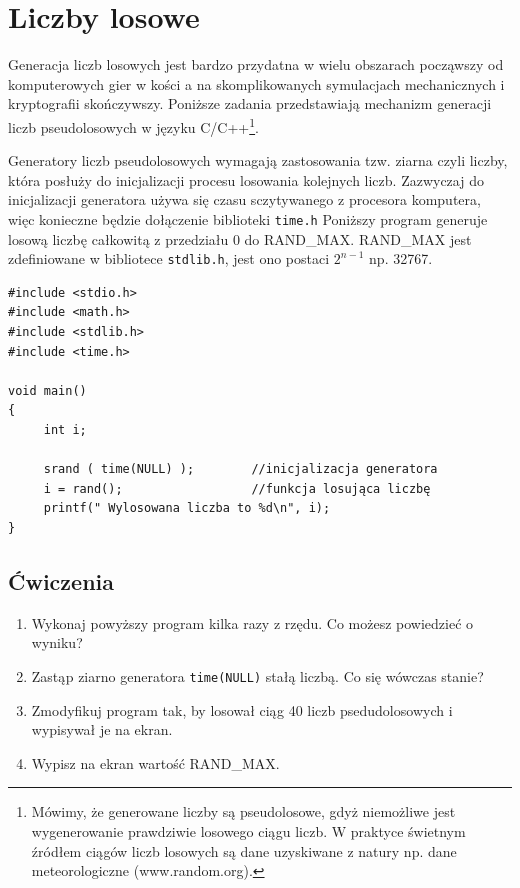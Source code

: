 \documentclass{instrukcja}
\begin{document}
\author{W. Regulski}
\materialtitle

\section*{Liczby losowe}
Generacja liczb losowych jest bardzo przydatna w wielu obszarach począwszy od komputerowych gier w kości a na skomplikowanych symulacjach mechanicznych i kryptografii skończywszy.
Poniższe zadania przedstawiają mechanizm generacji liczb pseudolosowych w języku C/C++\footnote{Mówimy, że generowane liczby są pseudolosowe, gdyż niemożliwe jest wygenerowanie prawdziwie losowego ciągu liczb. W praktyce świetnym źródłem ciągów liczb losowych są dane uzyskiwane z natury  np. dane meteorologiczne (www.random.org).}.\newline

Generatory liczb pseudolosowych wymagają zastosowania tzw. ziarna czyli liczby, która posłuży do inicjalizacji procesu losowania kolejnych liczb. Zazwyczaj do inicjalizacji generatora używa się czasu sczytywanego z procesora komputera, więc konieczne będzie dołączenie biblioteki {\tt time.h}\newline
Poniższy program generuje losową liczbę całkowitą z przedziału 0 do RAND\_MAX. RAND\_MAX jest zdefiniowane w bibliotece {\tt stdlib.h}, jest ono postaci \(2^{n-1}\)  np. 32767.

\begin{verbatim}
#include <stdio.h>
#include <math.h>
#include <stdlib.h>
#include <time.h>

void main()
{
     int i;

     srand ( time(NULL) );        //inicjalizacja generatora
     i = rand();                  //funkcja losująca liczbę
     printf(" Wylosowana liczba to %d\n", i);
}
\end{verbatim}

\subsection*{Ćwiczenia}
\begin{enumerate}
\item Wykonaj powyższy program kilka razy z rzędu. Co możesz powiedzieć o wyniku? 
\item Zastąp ziarno generatora {\tt  time(NULL)} stałą liczbą. Co się wówczas stanie?
\item Zmodyfikuj program tak, by losował ciąg 40 liczb psedudolosowych i wypisywał je na ekran.
\item Wypisz na ekran wartość RAND\_MAX.
\end{enumerate}
\end{document}
